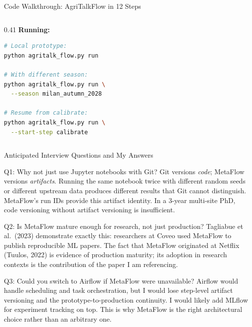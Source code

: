 \documentclass[10pt,aspectratio=169]{beamer}
\begin{document}
\begin{frame}[fragile]{Code Walkthrough: AgriTalkFlow in 12 Steps}
\begin{columns}
\begin{column}{0.41\textwidth}
\vspace{0.3cm}
\textbf{Running:}
\begin{lstlisting}[language=bash,frame=none,numbers=none]
# Local prototype:
python agritalk_flow.py run

# With different season:
python agritalk_flow.py run \
  --season milan_autumn_2028

# Resume from calibrate:
python agritalk_flow.py run \
  --start-step calibrate
\end{lstlisting}
\end{column}
\end{columns}

\end{frame}

\begin{frame}{Anticipated Interview Questions and My Answers}

\begin{block}{Q1: Why not just use Jupyter notebooks with Git?}
\small Git versions \emph{code}; MetaFlow versions \emph{artifacts}. Running the same notebook twice with different random seeds or different upstream data produces different results that Git cannot distinguish. MetaFlow's run IDs provide this artifact identity. In a 3-year multi-site PhD, code versioning without artifact versioning is insufficient.
\end{block}

\begin{block}{Q2: Is MetaFlow mature enough for research, not just production?}
\small Tagliabue et al.\ (2023) demonstrate exactly this: researchers at Coveo used MetaFlow to publish reproducible ML papers. The fact that MetaFlow originated at Netflix (Tuulos, 2022) is evidence of production maturity; its adoption in research contexts is the contribution of the paper I am referencing.
\end{block}

\begin{block}{Q3: Could you switch to Airflow if MetaFlow were unavailable?}
\small Airflow would handle scheduling and task orchestration, but I would lose step-level artifact versioning and the prototype-to-production continuity. I would likely add MLflow for experiment tracking on top. This is why MetaFlow is the right architectural choice rather than an arbitrary one.
\end{block}

\end{frame}
\end{document}
